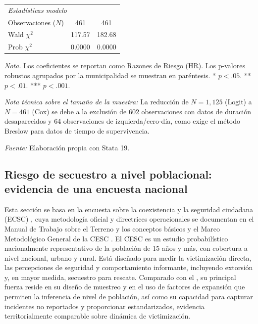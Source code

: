 \documentclass[12pt]{article}
\providecommand{\textcite}{\citet}
\theoremstyle{definition}
\theoremstyle{remark}
\newcommand{\1}{\mathbf{1}}
\begin{document}
{\begin{ThreePartTable}
\begin{longtable}{lcc}
        \multicolumn{3}{l}{\textit{Estadísticas modelo}} \\
        Observaciones ($N$) & 461 & 461 \\
        Wald $\chi^2$ & 117.57 & 182.68 \\
        Prob $\chi^2$ & 0.0000 & 0.0000 \\
        
    \end{longtable}
    
    \begin{tablenotes}
        \footnotesize 
        \item \textit{Nota.} Los coeficientes se reportan como Razones de Riesgo (HR). Los p-valores robustos agrupados por la municipalidad se muestran en paréntesis. * $p < .05$. ** $p < .01$. *** $p < .001$. 
        \item \textit{Nota técnica sobre el tamaño de la muestra:} La reducción de $N=1,125$ (Logit) a $N=461$ (Cox) se debe a la exclusión de 602 observaciones con datos de duración desaparecidos y 64 observaciones de izquierda/cero-día, como exige el método Breslow para datos de tiempo de supervivencia.
        \item \textit{Fuente:} Elaboración propia con Stata 19.
    \end{tablenotes}
\end{ThreePartTable}

}


\subsection{Riesgo de secuestro a nivel poblacional: evidencia de una encuesta nacional}

Esta sección se basa en la encuesta sobre la coexistencia y la seguridad ciudadana (ECSC) \textcite{DANE_ECSC_2021}, cuya metodología oficial y directrices operacionales se documentan en el Manual de Trabajo sobre el Terreno y los conceptos básicos \textcite{dane2022manual} y el Marco Metodológico General de la CESC \textcite{dane2022ecsc}. El CESC es un estudio probabilístico nacionalmente representativo de la población de 15 años y más, con cobertura a nivel nacional, urbano y rural. Está diseñado para medir la victimización directa, las percepciones de seguridad y comportamiento informante, incluyendo extorsión y, en mayor medida, secuestro para rescate. Comparado con el \textcite{cnmh_datos}, su principal fuerza reside en su diseño de muestreo y en el uso de factores de expansión que permiten la inferencia de nivel de población, así como su capacidad para capturar incidentes no reportados y proporcionar estandarizados, evidencia territorialmente comparable sobre dinámica de victimización.
\end{document}
